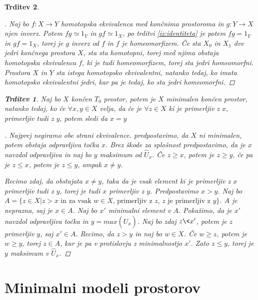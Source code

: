 \documentclass[a4paper,12pt]{article}
\theoremstyle{definition}
\theoremstyle{plain}
\theoremstyle{definition}
\theoremstyle{plain}
\newtheorem{trditev}{Trditev}
\theoremstyle{plain}
\theoremstyle{plain}
\theoremstyle{plain}
\newenvironment{dokaz}{\begin{proof}[\bfseries\upshape\proofname]}{\end{proof}}
\begin{document}
\begin{trditev}
\begin{dokaz}
    Naj bo $f:X\rightarrow Y$ homotopska ekvivalenca med 
    končnima prostoroma in $g:Y\rightarrow X$ njen inverz. 
    Potem $fg\simeq 1_Y$ in $gf \simeq 1_X$, po trditvi 
    \ref{iz:identiteta} je potem $fg = 1_Y$ in $gf = 1_X$,
    torej je $g$ inverz od $f$ in $f$ je homeomorfizem. Če 
    sta $X_0$ in $X_1$ dve jedri končnega prostora $X$, sta 
    sta homotopni, torej med njima obstaja homotopska ekvivalenca $f$, 
    ki je tudi homeomorfizem, torej sta jedri homeomorfni. 
    Prostora $X$ in $Y$ sta istega homotopsko ekvivalentni, 
    natanko tedaj, ko imata homotopsko ekvivalentni jedri, 
    kar pa je tedaj, ko sta jedri homeomorfni.
\end{dokaz}


\begin{trditev}
Naj bo $X$ končen $T_0$ prostor, potem je $X$ minimalen končen prostor, natanko tedaj, ko če $\forall x,y\in X$ velja, da če je  $\forall z\in X$ ki je primerljiv z $x$, primerljiv tudi z $y$, potem sledi da $x=y$
\end{trditev}

\begin{dokaz}
    Najprej negiramo obe strani ekvivalence. predpostavimo, da $X$ ni minimalen, potem obstaja odpravljiva točka $x$. Brez škode za splošnost predpostavimo, da je $x$ navzdol odpravljiva in naj bo $y$ maksimum od $\hat{U}_x$. Če $z\geq x$, potem je $z\geq y$, če pa je $z\le x$, potem je $z\leq y$, ampak $x\neq y$.

    Recimo zdaj, da obstajata $x\neq y$, taka da je vsak 
    element ki je primerljiv z $x$ primerljiv tudi z $y$, 
    torej je tudi $x$ primerljiv z $y$. Predpostavimo 
    $x>y$. Naj bo $A=\{z\in X |  z>x \text{ in za vsak $w\in 
    X$, primerljiv z $z$, $z$ je primerljiv z $y$}\}$. $A$ 
    je neprazna, saj je $x\in A$. Naj bo $x'$ minimalni 
    element v $A$. Pokažimo, da je $x'$ navzdol odpravljiva 
    točka in $y=max(\hat{U}_x)$. Naj bo zdaj $z\<x'$, potem 
    je $z$ primerljiv $y$, saj $x'\in A$. Recimo, da $z>y$ 
    in naj bo $w\in X$. Če $w\geq z$, potem je $w\geq y$, 
    torej $z\in A$, kar je pa v protislovju z minimalnostjo 
    $x'$. Zato $z\leq y$, torej je $y$ maksimum v 
    $\hat{U}_x$.
\end{dokaz}

\section{Minimalni modeli prostorov}


\end{trditev}
\end{document}
